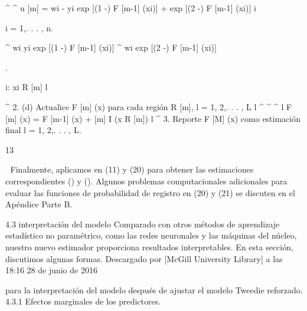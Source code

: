 \documentclass[]{article}
\begin{document}
\^{} \^{} u {[}m{]} = wi - yi exp {[}(1 -) F {[}m-1{]} (xi){]} + exp
{[}(2 -) F {[}m-1{]} (xi){]} i

i = 1,. . . , n.

\^{} wi yi exp {[}(1 -) F {[}m-1{]} (xi){]} \^{} wi exp {[}(2 -) F
{[}m-1{]} (xi){]}

.

i: xi R {[}m{]} l

\^{} 2. (d) Actualice F {[}m{]} (x) para cada región R {[}m{]}, l = 1,
2,. . . , L l \^{} \^{} \^{} l F {[}m{]} (x) = F {[}m-1{]} (x) + {[}m{]}
I (x R {[}m{]}) l \^{} 3. Reporte F {[}M{]} (x) como estimación final l
= 1, 2,. . . , L.

13

 Finalmente, aplicamos en (11) y (20) para obtener las estimaciones
correspondientes () y (). Algunos problemas computacionales adicionales
para evaluar las funciones de probabilidad de registro en (20) y (21) se
discuten en el Apéndice Parte B.

4.3 interpretación del modelo Comparado con otros métodos de aprendizaje
estadístico no paramétrico, como las redes neuronales y las máquinas del
núcleo, nuestro nuevo estimador proporciona resultados interpretables.
En esta sección, discutimos algunas formas. Descargado por {[}McGill
University Library{]} a las 18:16 28 de junio de 2016

para la interpretación del modelo después de ajustar el modelo Tweedie
reforzado. 4.3.1 Efectos marginales de los predictores.
\end{document}
